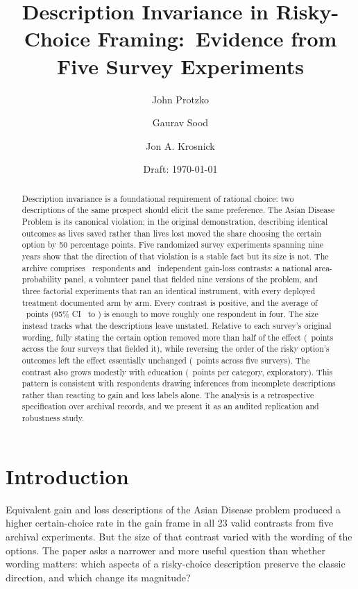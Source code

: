 \documentclass[11pt]{article}
\title{Description Invariance in Risky-Choice Framing:\
Evidence from Five Survey Experiments}
\author{John Protzko \and Gaurav Sood \and Jon A. Krosnick}
\date{Draft: \today}
\begin{document}
\maketitle

\begin{abstract}
Description invariance is a foundational requirement of rational choice: two descriptions of the same prospect should elicit the same preference. The Asian Disease Problem is its canonical violation; in the original demonstration, describing identical outcomes as lives saved rather than lives lost moved the share choosing the certain option by 50 percentage points. Five randomized survey experiments spanning nine years show that the direction of that violation is a stable fact but its size is not. The archive comprises \ArchiveMetaN\ respondents and \ArchiveMetaK\ independent gain-loss contrasts: a national area-probability panel, a volunteer panel that fielded nine versions of the problem, and three factorial experiments that ran an identical instrument, with every deployed treatment documented arm by arm. Every contrast is positive, and the average of \ArchiveMetaEffect\ points (95\% CI \ArchiveMetaLow\ to \ArchiveMetaHigh) is enough to move roughly one respondent in four. The size instead tracks what the descriptions leave unstated. Relative to each survey's original wording, fully stating the certain option removed more than half of the effect (\BalancedAttenuation\ points across the four surveys that fielded it), while reversing the order of the risky option's outcomes left the effect essentially unchanged (\FlipChangeEffect\ points across five surveys). The contrast also grows modestly with education (\EducationMetaEffect\ points per category, exploratory). This pattern is consistent with respondents drawing inferences from incomplete descriptions rather than reacting to gain and loss labels alone. The analysis is a retrospective specification over archival records, and we present it as an audited replication and robustness study.
\end{abstract}

\onehalfspacing

\section{Introduction}

Equivalent gain and loss descriptions of the Asian Disease problem produced a higher certain-choice rate in the gain frame in all 23 valid contrasts from five archival experiments. But the size of that contrast varied with the wording of the options. The paper asks a narrower and more useful question than whether wording matters: which aspects of a risky-choice description preserve the classic direction, and which change its magnitude?
\end{document}
